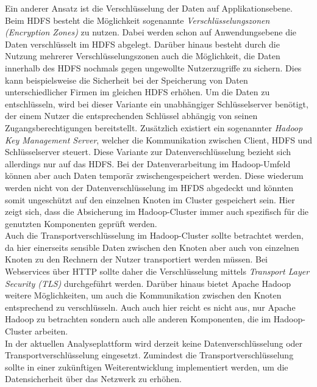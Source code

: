 \noindent
Ein anderer Ansatz ist die Verschlüsselung der Daten auf Applikationsebene. Beim HDFS besteht die Möglichkeit sogenannte \textit{Verschlüsselungszonen (Encryption Zones)} zu nutzen. Dabei werden schon auf Anwendungsebene die Daten verschlüsselt im HDFS abgelegt. Darüber hinaus besteht durch die Nutzung mehrerer Verschlüsselungszonen auch die Möglichkeit, die Daten innerhalb des HDFS nochmals gegen ungewollte Nutzerzugriffe zu sichern. Dies kann beispielsweise die Sicherheit bei der Speicherung von Daten unterschiedlicher Firmen im gleichen HDFS erhöhen. Um die Daten zu entschlüsseln, wird bei dieser Variante ein unabhängiger Schlüsselserver benötigt, der einem Nutzer die entsprechenden Schlüssel abhängig von seinen Zugangsberechtigungen bereitstellt. Zusätzlich existiert ein sogenannter \textit{Hadoop Key Management Server}, welcher die Kommunikation zwischen Client, HDFS und Schlüsselserver steuert.\cite[S. 192-200]{hadoop_security}
Diese Variante zur Datenverschlüsselung bezieht sich allerdings nur auf das HDFS. Bei der Datenverarbeitung im Hadoop-Umfeld können aber auch Daten temporär zwischengespeichert werden. Diese wiederum werden nicht von der Datenverschlüsselung im HFDS abgedeckt und könnten somit ungeschützt auf den einzelnen Knoten im Cluster gespeichert sein. Hier zeigt sich, dass die Absicherung im Hadoop-Cluster immer auch spezifisch für die genutzten Komponenten geprüft werden. \\

\noindent
Auch die Transportverschlüsselung im Hadoop-Cluster sollte betrachtet werden, da hier einerseits sensible Daten zwischen den Knoten aber auch von einzelnen Knoten zu den Rechnern der Nutzer transportiert werden müssen. Bei Webservices über HTTP sollte daher die Verschlüsselung mittels \textit{Transport Layer Security (TLS)} durchgeführt werden. Darüber hinaus bietet Apache Hadoop weitere Möglichkeiten, um auch die Kommunikation zwischen den Knoten entsprechend zu verschlüsseln. Auch auch hier reicht es nicht aus, nur Apache Hadoop zu betrachten sondern auch alle anderen Komponenten, die im Hadoop-Cluster arbeiten. \cite[S. 207-216]{hadoop_security}\\

\noindent
In der aktuellen Analyseplattform wird derzeit keine Datenverschlüsselung oder Transportverschlüsselung eingesetzt. Zumindest die Transportverschlüsselung sollte in einer zukünftigen Weiterentwicklung implementiert werden, um die Datensicherheit über das Netzwerk zu erhöhen.

